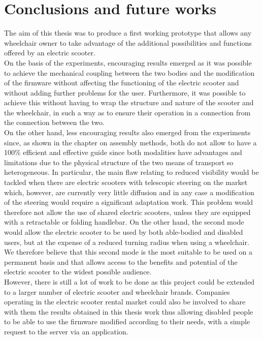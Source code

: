 \documentclass[binding=0.6cm,LaM,noexaminfo]{sapthesis}
\begin{document}
\chapter{Conclusions and future works}
The aim of this thesis was to produce a first working prototype that allows any wheelchair owner to take advantage of the additional possibilities and functions offered by an electric scooter.\\
On the basis of the experiments, encouraging results emerged as it was possible to achieve the mechanical coupling between the two bodies and the modification of the firmware without affecting the functioning of the electric scooter and without adding further problems for the user. Furthermore, it was possible to achieve this without having to wrap the structure and nature of the scooter and the wheelchair, in such a way as to ensure their operation in a connection from the connection between the two.\\
On the other hand, less encouraging results also emerged from the experiments since, as shown in the chapter on assembly methods, both do not allow to have a 100\% efficient and effective guide since both modalities have advantages and limitations due to the physical structure of the two means of transport so heterogeneous. In particular, the main flaw relating to reduced visibility would be tackled when there are electric scooters with telescopic steering on the market which, however, are currently very little diffusion and in any case a modification of the steering would require a significant adaptation work. This problem would therefore not allow the use of shared electric scooters, unless they are equipped with a retractable or folding handlebar. On the other hand, the second mode would allow the electric scooter to be used by both able-bodied and disabled users, but at the expense of a reduced turning radius when using a wheelchair. We therefore believe that this second mode is the most suitable to be used on a permanent basis and that allows access to the benefits and potential of the electric scooter to the widest possible audience.\\
However, there is still a lot of work to be done as this project could be extended to a larger number of electric scooter and wheelchair brands. Companies operating in the electric scooter rental market could also be involved to share with them the results obtained in this thesis work thus allowing disabled people to be able to use the firmware modified according to their needs, with a simple request to the server via an application.\\
\end{document}
